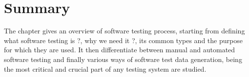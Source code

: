 



\section{Summary}
The chapter gives an overview of software testing process, starting from defining what software testing is ?, why we need it ?, its common types and the purpose for which they are used. It then differentiate between manual and automated software testing and finally various ways of software test data generation, being the most critical and crucial part of any testing system are studied.




